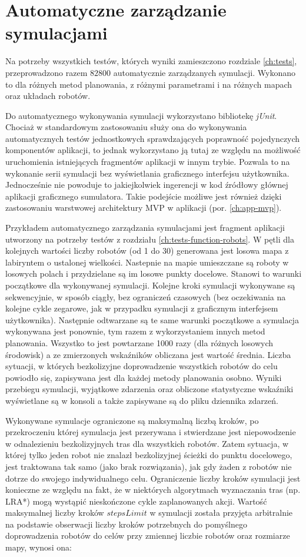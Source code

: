 \section{Automatyczne zarządzanie symulacjami}
Na potrzeby wszystkich testów, których wyniki zamieszczono rozdziale \ref{ch:tests}, przeprowadzono razem $82 800$ automatycznie zarządzanych symulacji. Wykonano to dla różnych metod planowania, z różnymi parametrami i na różnych mapach oraz układach robotów.

Do automatycznego wykonywania symulacji wykorzystano bibliotekę {\it jUnit}. Chociaż w standardowym zastosowaniu służy ona do wykonywania automatycznych testów jednostkowych sprawdzających poprawność pojedynczych komponentów aplikacji, to jednak wykorzystano ją tutaj ze względu na możliwość uruchomienia istniejących fragmentów aplikacji w innym trybie.
Pozwala to na wykonanie serii symulacji bez wyświetlania graficznego interfejsu użytkownika.
Jednocześnie nie powoduje to jakiejkolwiek ingerencji w kod źródłowy głównej aplikacji graficznego sumulatora.
Takie podejście możliwe jest również dzięki zastosowaniu warstwowej architektury MVP w aplikacji (por. \ref{ch:app-mvp}).

Przykładem automatycznego zarządzania symulacjami jest fragment aplikacji utworzony na potrzeby testów z rozdziału \ref{ch:tests-function-robots}.
W pętli dla kolejnych wartości liczby robotów (od 1 do 30) generowana jest losowa mapa z labiryntem o ustalonej wielkości.
Nastepnie na mapie umieszczane są roboty w losowych polach i przydzielane są im losowe punkty docelowe.
Stanowi to warunki początkowe dla wykonywanej symulacji. Kolejne kroki symulacji wykonywane są sekwencyjnie, w sposób ciągły, bez ograniczeń czasowych (bez oczekiwania na kolejne cykle zegarowe, jak w przypadku symulacji z graficznym interfejsem użytkownika).
Następnie odtwarzane są te same warunki początkowe a symulacja wykonywana jest ponownie, tym razem z wykorzystaniem innych metod planowania.
Wszystko to jest powtarzane 1000 razy (dla różnych losowych środowisk) a ze zmierzonych wskaźników obliczana jest wartość średnia.
Liczba sytuacji, w których bezkolizyjne doprowadzenie wszystkich robotów do celu powiodło się, zapisywana jest dla każdej metody planowania osobno.
Wyniki przebiegu symulacji, wyjątkowe zdarzenia oraz obliczone statystyczne wskaźniki wyświetlane są w konsoli a także zapisywane są do pliku dziennika zdarzeń.

Wykonywane symulacje ograniczone są maksymalną liczbą kroków, po przekroczeniu której symulacja jest przerywana i stwierdzane jest niepowodzenie w odnalezieniu bezkolizyjnych tras dla wszystkich robotów.
Zatem sytuacja, w której tylko jeden robot nie znalazł bezkolizyjnej ścieżki do punktu docelowego, jest traktowana tak samo (jako brak rozwiązania), jak gdy żaden z robotów nie dotrze do swojego indywidualnego celu.
Ograniczenie liczby kroków symulacji jest konieczne ze względu na fakt, że w niektórych algorytmach wyznaczania tras (np. LRA*) mogą wystąpić nieskończone cykle zaplanowanych akcji.
Wartość maksymalnej liczby kroków $stepsLimit$ w symulacji została przyjęta arbitralnie na podstawie obserwacji liczby kroków potrzebnych do pomyślnego doprowadzenia robotów do celów przy zmiennej liczbie robotów oraz rozmiarze mapy, wynosi ona:

